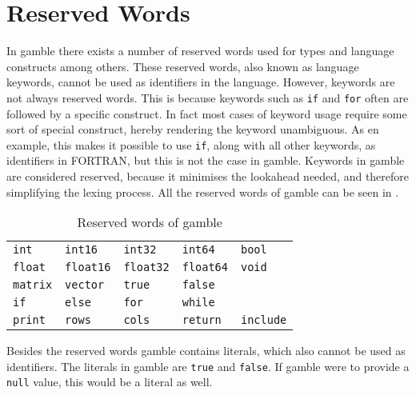 \section{Reserved Words}

\label{sec:reserved_words}
In \gls{gamble} there exists a number of reserved words used for types and language constructs among others.
These reserved words, also known as language keywords, cannot be used as identifiers in the language. However, keywords are not always reserved words.
This is because keywords such as \texttt{if} and \texttt{for} often are followed by a specific construct.
In fact most cases of keyword usage require some sort of special construct, hereby rendering the keyword unambiguous.
As en example, this makes it possible to use \texttt{if}, along with all other keywords, as identifiers in FORTRAN, but this is not the case in \gls{gamble}.\citep{fortran_identifiers}
Keywords in \gls{gamble} are considered reserved, because it minimises the lookahead needed, and therefore simplifying the lexing process.
All the reserved words of \gls{gamble} can be seen in  .
\begin{table}[h!]
	\centering
	\def\arraystretch{1.5} \setlength{\tabcolsep}{2em}
	\begin{tabular}{l l l l l}
        \texttt{int}     & \texttt{int16}     & \texttt{int32}     & \texttt{int64}     & \texttt{bool}    \\
        \texttt{float}   & \texttt{float16}   & \texttt{float32}   & \texttt{float64}   & \texttt{void}    \\
        \texttt{matrix}  & \texttt{vector}    & \texttt{true}      & \texttt{false}     &                  \\
        \texttt{if}      & \texttt{else}      & \texttt{for}       & \texttt{while}     &                  \\
        \texttt{print}   & \texttt{rows}      & \texttt{cols}      & \texttt{return}    & \texttt{include} \\
    \end{tabular}\caption{Reserved words of \gls{gamble}}\label{res:words}
	\def\arraystretch{1}
\end{table}

Besides the reserved words \gls{gamble} contains literals, which also cannot be used as identifiers.
The literals in \gls{gamble} are \texttt{true} and \texttt{false}.
If \gls{gamble} were to provide a \texttt{null} value, this would be a literal as well.

